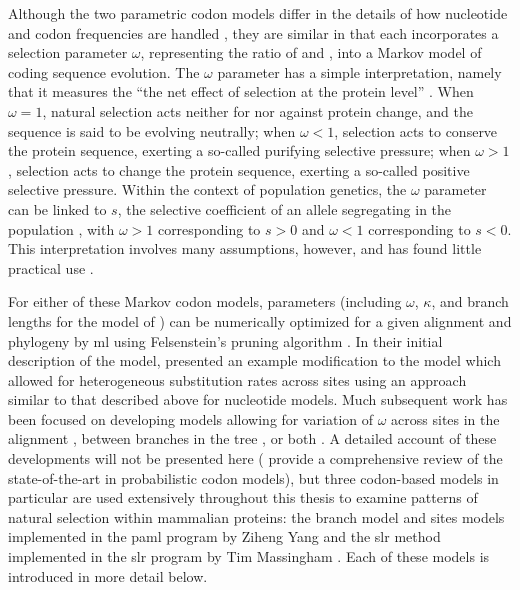Although the two parametric codon models differ in the details of how
nucleotide and codon frequencies are handled
\citep{Yang2000c,Bierne2003a}, they are similar in that each
incorporates a selection parameter $\omega$, representing the ratio of
\dn and \ds, into a Markov model of coding sequence evolution. The
$\omega$ parameter has a simple interpretation, namely that it
measures the ``the net effect of selection at the protein level''
\citep{Yang2000CodonSubstitution}. When $\omega=1$, natural selection
acts neither for nor against protein change, and the sequence is said
to be evolving neutrally; when $\omega<1$, selection acts to conserve
the protein sequence, exerting a so-called purifying selective
pressure; when $\omega>1$, selection acts to change the protein
sequence, exerting a so-called positive selective pressure. Within the
context of population genetics, the $\omega$ parameter can be linked
to $s$, the selective coefficient of an allele segregating in the
population \citep{Nielsen2003,Nielsen2005b,Kryazhimskiy2008}, with
$\omega>1$ corresponding to $s>0$ and $\omega<1$ corresponding to
$s<0$. This interpretation involves many assumptions, however, and has
found little practical use \citep{Nielsen2003,Nielsen2005b}.

For either of these Markov codon models, parameters (including
$\omega$, $\kappa$, and branch lengths for the model of
\citet{Goldman1994a}) can be numerically optimized for a given
alignment and phylogeny by \ac{ml} using Felsenstein's pruning
algorithm \citep{Felsenstein1981a,Goldman1994a,Yang2000c}. In their
initial description of the model, \citet{Goldman1994a} presented an
example modification to the model which allowed for heterogeneous
substitution rates across sites using an approach similar to that
described above for nucleotide models. Much subsequent work has been
focused on developing models allowing for variation of $\omega$ across
sites in the alignment
\citep{Nielsen1998,Yang2000CodonSubstitution,Yang2002,
  Wong2004,Yang2005Bayes,Massingham2005}, between branches in the tree
\citep{Yang1998a}, or both \citep{Yang2002b,Zhang2005}.  A detailed
account of these developments will not be presented here
(\citet{Anisimova2009} provide a comprehensive review of the
state-of-the-art in probabilistic codon models), but three codon-based
models in particular are used extensively throughout this thesis to
examine patterns of natural selection within mammalian proteins: the
branch model and sites models implemented in the \ac{paml} program by
Ziheng Yang \citep{Yang2007PAML} and the \ac{slr} method implemented
in the \ac{slr} program by Tim Massingham \citep{Massingham2005}. Each
of these models is introduced in more detail below.

